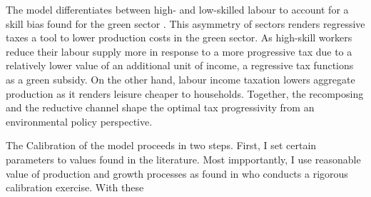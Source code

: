The model differentiates between high- and low-skilled labour to account for a skill bias found for the green sector \citep{Consoli2016DoCapital}. This asymmetry of sectors renders regressive taxes a tool to lower production costs in the green sector. As high-skill workers reduce their labour supply more in response to a more progressive tax due to a relatively lower value of an additional unit of income, a regressive tax functions as a green subsidy. %
On the other hand, labour income taxation lowers aggregate production as it renders leisure cheaper to households. 
Together, the recomposing and the reductive channel shape the optimal tax progressivity from an environmental policy perspective. 

The Calibration of the model proceeds in two steps. First, I set certain parameters to values found in the literature. Most impportantly, I use reasonable value of production and growth processes as found in \cite{Fried2018ClimateAnalysis} who conducts a rigorous calibration exercise.  With these 


